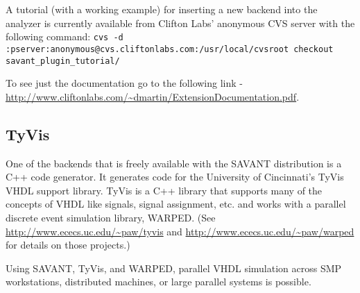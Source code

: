 \documentclass[11pt]{article}
\begin{document}
A tutorial (with a working example) for inserting a new backend into the
analyzer is currently available from Clifton Labs' anonymous CVS server
with the following command:
\texttt{cvs -d :pserver:anonymous@cvs.cliftonlabs.com:/usr/local/cvsroot
checkout savant_plugin_tutorial/}

To see just the documentation go to the following link -
\url{http://www.cliftonlabs.com/~dmartin/ExtensionDocumentation.pdf}.

\subsection{TyVis}
One of the backends that is freely available with the SAVANT distribution
is a C++ code generator. It generates code for the University of
Cincinnati's TyVis VHDL support library. TyVis is a C++ library that
supports many of the concepts of VHDL like signals, signal assignment,
etc. and works with a parallel discrete event simulation library, {\sc
WARPED}.  (See
\url{http://www.ececs.uc.edu/~paw/tyvis} and
\url{http://www.ececs.uc.edu/~paw/warped} for details on those projects.)

Using SAVANT, TyVis, and {\sc WARPED}, parallel VHDL simulation across SMP
workstations, distributed machines, or large parallel systems is possible.
\end{document}
